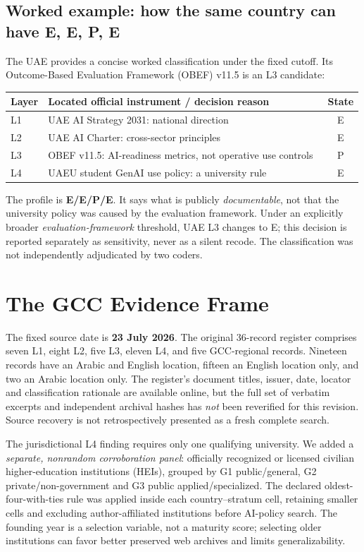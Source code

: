 \documentclass[conference,letterpaper]{IEEEtran}
\begin{document}
\subsection{Worked example: how the same country can have E, E, P, E}
The UAE provides a concise worked classification under the fixed cutoff. Its Outcome-Based Evaluation Framework (OBEF) v11.5 is an L3 candidate:
\begin{center}
\small\setlength{\tabcolsep}{4pt}
\begin{tabularx}{\columnwidth}{@{}p{}Xc@{}}
\toprule
Layer & Located official instrument / decision reason & State\\\midrule
L1 & UAE AI Strategy 2031: national direction~\cite{uaestrategy} & E\\
L2 & UAE AI Charter: cross-sector principles~\cite{uaecharter} & E\\
L3 & OBEF v11.5: AI-readiness metrics, not operative use controls~\cite{obef} & P\\
L4 & UAEU student GenAI use policy: a university rule~\cite{uaeupolicy} & E\\\bottomrule
\end{tabularx}
\end{center}
The profile is \textbf{E/E/P/E}. It says what is publicly \emph{documentable}, not that the university policy was caused by the evaluation framework. Under an explicitly broader \emph{evaluation-framework} threshold, UAE L3 changes to E; this decision is reported separately as sensitivity, never as a silent recode. The classification was not independently adjudicated by two coders.

\section{The GCC Evidence Frame}
The fixed source date is \textbf{23 July 2026}. The original 36-record register comprises seven L1, eight L2, five L3, eleven L4, and five GCC-regional records. Nineteen records have an Arabic and English location, fifteen an English location only, and two an Arabic location only. The register's document titles, issuer, date, locator and classification rationale are available online, but the full set of verbatim excerpts and independent archival hashes has \emph{not} been reverified for this revision. Source recovery is not retrospectively presented as a fresh complete search.

The jurisdictional L4 finding requires only one qualifying university. We added a \emph{separate, nonrandom corroboration panel}: officially recognized or licensed civilian higher-education institutions (HEIs), grouped by G1 public/general, G2 private/non-government and G3 public applied/specialized. The declared oldest-four-with-ties rule was applied inside each country--stratum cell, retaining smaller cells and excluding author-affiliated institutions before AI-policy search. The founding year is a selection variable, not a maturity score; selecting older institutions can favor better preserved web archives and limits generalizability.
\end{document}
